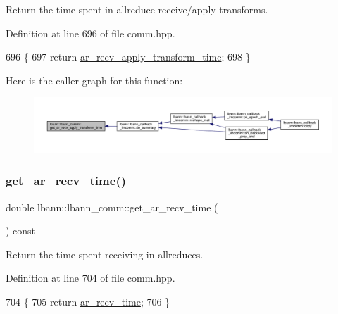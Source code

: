 Return the time spent in allreduce receive/apply transforms. 

Definition at line 696 of file comm.\+hpp.


\begin{DoxyCode}
696                                                          \{
697     \textcolor{keywordflow}{return} \hyperlink{classlbann_1_1lbann__comm_aa642b0ae2321fa464b0092da527f6375}{ar\_recv\_apply\_transform\_time};
698   \}
\end{DoxyCode}
Here is the caller graph for this function\+:\nopagebreak
\begin{figure}[H]
\begin{center}
\leavevmode
\includegraphics[width=350pt]{classlbann_1_1lbann__comm_a893af1da4330be474871eeb8b2f9a7b5_icgraph}
\end{center}
\end{figure}
\mbox{\label{classlbann_1_1lbann__comm_a925aad805ceda573cd380b95b8c4a34a}} 
\subsubsection{\texorpdfstring{get\+\_\+ar\+\_\+recv\+\_\+time()}{get\_ar\_recv\_time()}}
{\footnotesize\ttfamily double lbann\+::lbann\+\_\+comm\+::get\+\_\+ar\+\_\+recv\+\_\+time (\begin{DoxyParamCaption}{ }\end{DoxyParamCaption}) const\hspace{0.3cm}{\ttfamily [inline]}}

Return the time spent receiving in allreduces. 

Definition at line 704 of file comm.\+hpp.


\begin{DoxyCode}
704                                          \{
705     \textcolor{keywordflow}{return} \hyperlink{classlbann_1_1lbann__comm_a4c9323938961c3524dc67f4b7b47e3ae}{ar\_recv\_time};
706   \}
\end{DoxyCode}
\mbox{\label{classlbann_1_1lbann__comm_afa5144a3d7bd40e1d78193d9f299e8ec}} 
